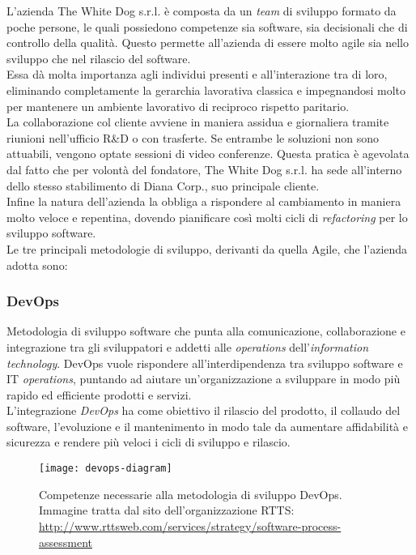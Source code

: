 L'azienda The White Dog s.r.l. è composta da un \textit{team} di sviluppo formato da poche persone, le quali possiedono competenze sia software, sia decisionali che di controllo della qualità. Questo permette all'azienda di essere molto agile sia nello sviluppo che nel rilascio del software. \\ 
Essa dà molta importanza agli individui presenti e all'interazione tra di loro, eliminando completamente la gerarchia lavorativa classica e impegnandosi molto per mantenere un ambiente lavorativo di reciproco rispetto paritario. \\
La collaborazione col cliente avviene in maniera assidua e giornaliera tramite riunioni nell'ufficio R\&D o con trasferte. Se entrambe le soluzioni non sono attuabili, vengono optate sessioni di video conferenze. Questa pratica è agevolata dal fatto che per volontà del fondatore, The White Dog s.r.l. ha sede all'interno dello stesso stabilimento di Diana Corp., suo principale cliente. \\
Infine la natura dell'azienda la obbliga a rispondere al cambiamento in maniera molto veloce e repentina, dovendo pianificare così molti cicli di \textit{refactoring} per lo sviluppo software. \\
Le tre principali metodologie di sviluppo, derivanti da quella Agile, che l'azienda adotta sono:

\subsubsection{DevOps}

Metodologia di sviluppo software che punta alla comunicazione, collaborazione e integrazione tra gli sviluppatori e addetti alle \textit{operations} dell'\textit{information technology}. DevOps vuole rispondere all'interdipendenza tra sviluppo software e IT \textit{operations}, puntando ad aiutare un'organizzazione a sviluppare in modo più rapido ed efficiente prodotti e servizi. \\
L'integrazione \textit{DevOps} ha come obiettivo il rilascio del prodotto, il collaudo del software, l'evoluzione e il mantenimento in modo tale da aumentare affidabilità e sicurezza e rendere più veloci i cicli di sviluppo e rilascio. 

\label{DevOps}
\begin{figure}[ht]
	\begin{center}
		\texttt{[image: devops-diagram]}
		\caption{Competenze necessarie alla metodologia di sviluppo DevOps. Immagine tratta dal sito dell'organizzazione RTTS: \url{http://www.rttsweb.com/services/strategy/software-process-assessment}}
	\end{center}
\end{figure}
\FloatBarrier

